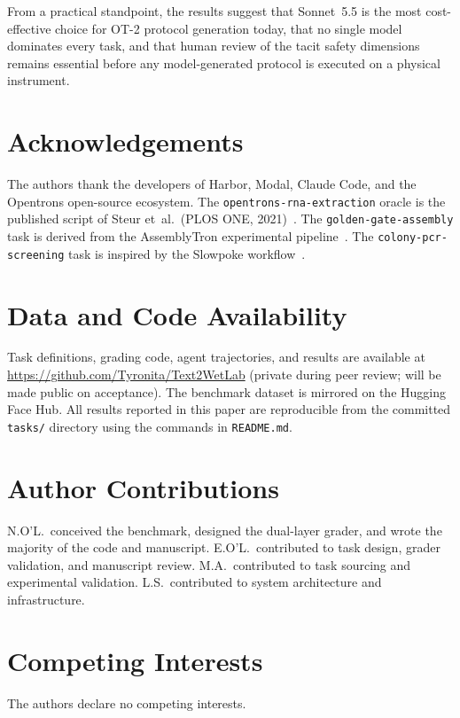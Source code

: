 \documentclass[11pt,a4paper]{article}
\begin{document}
From a practical standpoint, the results suggest that Sonnet~5.5 is the
most cost-effective choice for OT-2 protocol generation today, that no
single model dominates every task, and that human review of the tacit
safety dimensions remains essential before any model-generated protocol
is executed on a physical instrument.

\section*{Acknowledgements}

The authors thank the developers of Harbor, Modal, Claude Code, and the
Opentrons open-source ecosystem.
The \texttt{opentrons-rna-extraction} oracle is the published script of
Steur et~al.\ (PLOS ONE, 2021)~\citep{steur2021hulp}.
The \texttt{golden-gate-assembly} task is derived from the AssemblyTron
experimental pipeline~\citep{assemblytron2023}.
The \texttt{colony-pcr-screening} task is inspired by the Slowpoke
workflow~\citep{slowpoke2025}.

\section*{Data and Code Availability}

Task definitions, grading code, agent trajectories, and results are
available at \url{https://github.com/Tyronita/Text2WetLab} (private during
peer review; will be made public on acceptance).
The benchmark dataset is mirrored on the Hugging Face Hub.
All results reported in this paper are reproducible from the committed
\texttt{tasks/} directory using the commands in \texttt{README.md}.

\section*{Author Contributions}

N.O'L.\ conceived the benchmark, designed the dual-layer grader,
and wrote the majority of the code and manuscript.
E.O'L.\ contributed to task design, grader validation, and manuscript review.
M.A.\ contributed to task sourcing and experimental validation.
L.S.\ contributed to system architecture and infrastructure.

\section*{Competing Interests}

The authors declare no competing interests.



\end{document}
